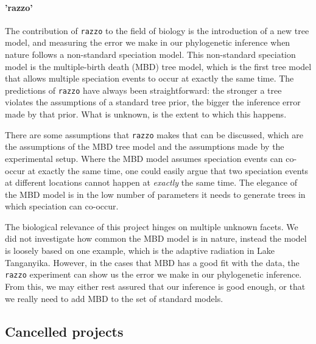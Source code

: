 \paragraph{'razzo'} 

The contribution of \verb;razzo; to the field of biology
is the introduction of a new tree model, 
and measuring the error we make in our phylogenetic inference when
nature follows a non-standard speciation model.
This non-standard speciation model is the multiple-birth death (MBD) tree model,
which is the first tree model that allows multiple speciation events to occur 
at exactly the same time.
The predictions of \verb;razzo; have always been straightforward:
the stronger a tree violates the assumptions of a standard tree
prior, the bigger the inference error made by that prior.
What is unknown, is the extent to which this happens.

There are some assumptions that \verb;razzo; makes that can be discussed,
which are the assumptions of the MBD tree model and the assumptions
made by the experimental setup.
Where the MBD model assumes speciation events can co-occur at exactly
the same time, one could easily argue that two speciation events
at different locations cannot happen at \emph{exactly} the same time.
The elegance of the MBD model is in the low number of parameters it
needs to generate trees in which speciation can co-occur.

The biological relevance of this project hinges on multiple unknown
facets. We did not investigate how common the MBD model is in nature,
instead the model is loosely based on one example, which is the 
adaptive radiation in Lake Tanganyika. However,
in the cases that MBD has a good fit with the data, 
the \verb;razzo; experiment can show us the error we make in our phylogenetic 
inference. From this, we may either rest assured that our inference is good 
enough, or that we really need to add MBD to the set of standard models.

 

\subsection{Cancelled projects}

